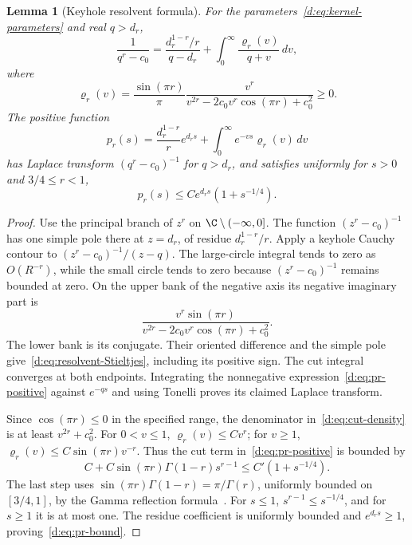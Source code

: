 \documentclass[11pt,a4paper]{article}
\numberwithin{equation}{section}
\newtheorem{lemma}[theorem]{Lemma}
\theoremstyle{definition}\newtheorem{definition}[theorem]{Definition}
\theoremstyle{remark}\newtheorem{remark}[theorem]{Remark}
\begin{document}
\begin{lemma}[Keyhole resolvent formula]\label{d:lem:keyhole}
For the parameters~\eqref{d:eq:kernel-parameters} and real $q>d_r$,
\begin{equation}\label{d:eq:resolvent-Stieltjes}
 \frac1{q^r-c_0}
 =\frac{d_r^{1-r}/r}{q-d_r}
   +\int_0^\infty\frac{\varrho_r(v)}{q+v}\,dv,
\end{equation}
where
\begin{equation}\label{d:eq:cut-density}
 \varrho_r(v)=\frac{\sin(\pi r)}{\pi}
 \frac{v^r}{v^{2r}-2c_0v^r\cos(\pi r)+c_0^2}\ge0.
\end{equation}
The positive function
\begin{equation}\label{d:eq:pr-positive}
 p_r(s)=\frac{d_r^{1-r}}r e^{d_rs}
             +\int_0^\infty e^{-vs}\varrho_r(v)\,dv
\end{equation}
has Laplace transform $(q^r-c_0)^{-1}$ for $q>d_r$, and satisfies uniformly for $s>0$ and $3/4\le r<1$,
\begin{equation}\label{d:eq:pr-bound}
 p_r(s)\le C e^{d_rs}(1+s^{-1/4}).
\end{equation}
\end{lemma}
\begin{proof}
Use the principal branch of $z^r$ on $\C\setminus(-\infty,0]$. The function $(z^r-c_0)^{-1}$ has one simple pole there at $z=d_r$, of residue $d_r^{1-r}/r$. Apply a keyhole Cauchy contour to
$(z^r-c_0)^{-1}/(z-q)$. The large-circle integral tends to zero as $O(R^{-r})$, while the small circle tends to zero because $(z^r-c_0)^{-1}$ remains bounded at zero. On the upper bank of the negative axis its negative imaginary part is
\[
 \frac{v^r\sin(\pi r)}
 {v^{2r}-2c_0v^r\cos(\pi r)+c_0^2}.
\]
The lower bank is its conjugate. Their oriented difference and the simple pole give~\eqref{d:eq:resolvent-Stieltjes}, including its positive sign. The cut integral converges at both endpoints. Integrating the nonnegative expression~\eqref{d:eq:pr-positive} against $e^{-qs}$ and using Tonelli proves its claimed Laplace transform.

Since $\cos(\pi r)\le0$ in the specified range, the denominator in~\eqref{d:eq:cut-density} is at least $v^{2r}+c_0^2$. For $0<v\le1$, $\varrho_r(v)\le C v^r$; for $v\ge1$,
$\varrho_r(v)\le C\sin(\pi r)v^{-r}$. Thus the cut term in~\eqref{d:eq:pr-positive} is bounded by
\[
 C+C\sin(\pi r)\Gamma(1-r)s^{r-1}
 \le C'(1+s^{-1/4}).
\]
The last step uses
$\sin(\pi r)\Gamma(1-r)=\pi/\Gamma(r)$, uniformly bounded on $[3/4,1]$, by the Gamma reflection formula~\cite[Eq.~5.5.3]{DLMF}. For $s\le1$, $s^{r-1}\le s^{-1/4}$, and for $s\ge1$ it is at most one. The residue coefficient is uniformly bounded and $e^{d_rs}\ge1$, proving~\eqref{d:eq:pr-bound}.
\end{proof}
\end{document}
